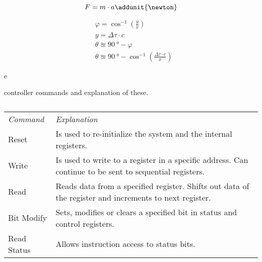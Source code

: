 \begin{equation}
F = m \cdot a \addunit{\newton}
\end{equation}
\startexplain
\stopexplain

\begin{subequations} \label{eq:tech_ToA}
	\begin{flalign}
		&\varphi = \cos^{-1} \left( \frac{y}{x} \right) \\
		&y = \Delta \tau \cdot c \\
		&\theta \approxeq \SI{90}{\degree} - \varphi \\
		&\theta \approxeq \SI{90}{\degree} - \cos^{-1} \left( \frac{ \Delta\tau \cdot c}{x} \right)
	\end{flalign}
\end{subequations}



\gls{e}



\begin{table}[h]
	\centering
	\caption{controller commands and explanation of these.}
	
	\begin{tabularx}{\textwidth}{lX}
		\textit{Command}		&	\textit{Explanation} \\ \rowcolor{lightGrey} \toprule
		Reset					&	Is used to re-initialize the system and the internal registers.\\
		Write					&	Is used to write to a register in a specific address. Can continue to be sent to sequential registers.\\ \rowcolor{lightGrey}
		Read					&	Reads data from a specified register. Shifts out data of the register and increments to next register.\\
		Bit Modify				&	Sets, modifies or clears a specified bit in status and control registers.\\ \rowcolor{lightGrey}
		Read Status				&	Allows instruction access to status bits.\\
	\end{tabularx}
	\caption*{\citep{MCP2510}}
\end{table}\label{tab:mcp_cmd_expl}





